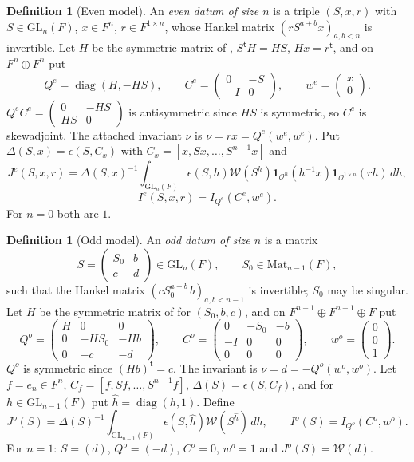 \documentclass[11pt,oneside,notitlepage]{book}
\numberwithin{equation}{section}
\theoremstyle{plain}
\theoremstyle{definition}
\newtheorem{definition}[theorem]{Definition}
\newcommand{\cO}{\mathcal{O}}
\newcommand{\GL}{\mathrm{GL}}
\newcommand{\Mat}{\mathrm{Mat}}
\newcommand{\cW}{\mathcal{W}}
\newcommand{\diag}{\operatorname{diag}}
\newcommand{\one}{\mathbf{1}}
\begin{document}
\begin{definition}[Even model]\label{def:even}
An \emph{even datum of size $n$} is a triple $(S,x,r)$ with $S\in\GL_n(F)$, $x\in F^n$, $r\in F^{1\times n}$, whose Hankel matrix $(rS^{a+b}x)_{a,b<n}$ is invertible. Let $H$ be the symmetric matrix of , $S^{\mathsf t}H=HS$, $Hx=r^{\mathsf t}$, and on $F^n\oplus F^n$ put
\[Q^e=\diag(H,-HS),\qquad C^e=\begin{pmatrix}0&-S\\-I&0\end{pmatrix},\qquad w^e=\begin{pmatrix}x\\0\end{pmatrix}.\]
$Q^eC^e=\left(\begin{smallmatrix}0&-HS\\HS&0\end{smallmatrix}\right)$ is antisymmetric since $HS$ is symmetric, so $C^e$ is skewadjoint. The attached invariant $\nu$ is $\nu=rx=Q^e(w^e,w^e)$. Put $\Delta(S,x)=\epsilon(S,C_x)$ with $C_x=[x,Sx,\dots,S^{n-1}x]$ and
\[J^e(S,x,r)=\Delta(S,x)^{-1}\int_{\GL_n(F)}\epsilon(S,h)\cW(S^h)\one_{\cO^n}(h^{-1}x)\one_{\cO^{1\times n}}(rh)\,dh,\]\[I^e(S,x,r)=I_{Q^e}(C^e,w^e).\]
For $n=0$ both are $1$.
\end{definition}

\begin{definition}[Odd model]\label{def:odd}
An \emph{odd datum of size $n$} is a matrix
\[S=\begin{pmatrix}S_0&b\\c&d\end{pmatrix}\in\GL_n(F),\qquad S_0\in\Mat_{n-1}(F),\]
such that the Hankel matrix $(cS_0^{a+b}\,b)_{a,b<n-1}$ is invertible; $S_0$ may be singular. Let $H$ be the symmetric matrix of  for $(S_0,b,c)$, and on $F^{n-1}\oplus F^{n-1}\oplus F$ put
\[Q^o=\begin{pmatrix}H&0&0\\0&-HS_0&-Hb\\0&-c&-d\end{pmatrix},\qquad C^o=\begin{pmatrix}0&-S_0&-b\\-I&0&0\\0&0&0\end{pmatrix},\qquad w^o=\begin{pmatrix}0\\0\\1\end{pmatrix}.\]
$Q^o$ is symmetric since $(Hb)^{\mathsf t}=c$. The invariant is $\nu=d=-Q^o(w^o,w^o)$. Let $f=e_n\in F^n$, $C_f=[f,Sf,\dots,S^{n-1}f]$, $\Delta(S)=\epsilon(S,C_f)$, and for $h\in\GL_{n-1}(F)$ put $\hat h=\diag(h,1)$. Define
\[J^o(S)=\Delta(S)^{-1}\int_{\GL_{n-1}(F)}\epsilon(S,\hat h)\cW(S^{\hat h})\,dh,\qquad I^o(S)=I_{Q^o}(C^o,w^o).\]
For $n=1$: $S=(d)$, $Q^o=(-d)$, $C^o=0$, $w^o=1$ and $J^o(S)=\cW(d)$.
\end{definition}
\end{document}
